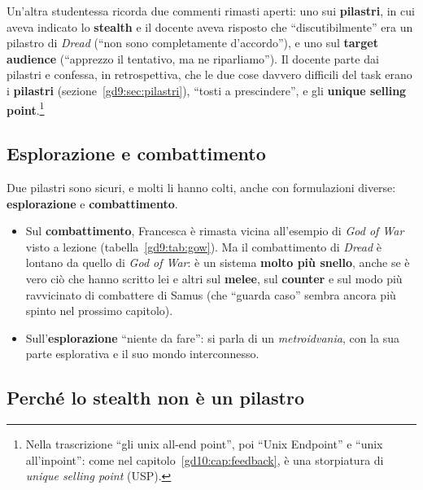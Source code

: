 Un'altra studentessa ricorda due commenti rimasti aperti: uno sui
\textbf{pilastri}, in cui aveva indicato lo \textbf{stealth} e il docente
aveva risposto che ``discutibilmente'' era un pilastro di \emph{Dread}
(``non sono completamente d'accordo''), e uno sul \textbf{target audience}
(``apprezzo il tentativo, ma ne riparliamo''). Il docente parte dai pilastri
e confessa, in retrospettiva, che le due cose davvero difficili del task
erano i \textbf{pilastri} (sezione~\ref{gd9:sec:pilastri}), ``tosti a
prescindere'', e gli \textbf{unique selling point}.\footnote{Nella
trascrizione ``gli unix all-end point'', poi ``Unix Endpoint'' e ``unix
all'inpoint'': come nel capitolo~\ref{gd10:cap:feedback}, è una storpiatura
di \emph{unique selling point} (USP).}

\subsection{Esplorazione e combattimento}

Due pilastri sono sicuri, e molti li hanno colti, anche con formulazioni
diverse: \textbf{esplorazione} e \textbf{combattimento}.
\begin{itemize}
  \item Sul \textbf{combattimento}, Francesca è rimasta vicina all'esempio
        di \emph{God of War} visto a lezione (tabella~\ref{gd9:tab:gow}).
        Ma il combattimento di \emph{Dread} è lontano da quello di
        \emph{God of War}: è un sistema \textbf{molto più snello}, anche se
        è vero ciò che hanno scritto lei e altri sul \textbf{melee}, sul
        \textbf{counter} e sul modo più ravvicinato di combattere di Samus
        (che ``guarda caso'' sembra ancora più spinto nel prossimo
        capitolo).
  \item Sull'\textbf{esplorazione} ``niente da fare'': si parla di un
        \emph{metroidvania}, con la sua parte esplorativa e il suo mondo
        interconnesso.
\end{itemize}

\subsection{Perché lo stealth non è un pilastro}

